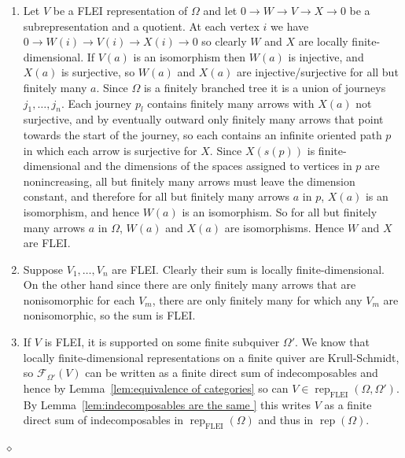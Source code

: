 \documentclass{article}
\newcommand{\FF}{\mathscr{F}}
\newenvironment{proof}{\vspace*{2ex}\noindent {\em Proof:}
}{\hfill $\diamond$ \\[2ex]}
\begin{document}
\begin{proof}
  \begin{enumerate}
  \item  Let $V$ be a FLEI representation of $\Omega$ and let $0 \to W \to V \to X \to 0$ be a subrepresentation and a quotient. At each vertex $i$ we have  $0 \to W(i) \to V(i) \to X(i) \to 0$ so clearly $W$ and $X$ are locally finite-dimensional. If $V(a)$ is an isomorphism then $W(a)$ is injective, and $X(a)$ is surjective,  so $W(a)$ and $X(a)$ are injective/surjective for all but finitely many $a$.  Since  $\Omega$ is a finitely branched tree it is a  union of journeys  $j_1, \ldots , j_n$.  Each journey $p_l$ contains finitely many arrows with $X(a)$ not surjective, and by eventually outward only finitely many arrows that point towards the start of the journey,  so each contains an infinite oriented path $p$ in which each arrow is surjective for $X$. Since $X(s(p))$ is finite-dimensional and the dimensions of the spaces assigned to vertices in $p$ are nonincreasing, all but finitely many arrows must leave the dimension constant, and therefore for all but finitely many arrows $a$ in $p$, $X(a)$ is an isomorphism, and hence $W(a)$ is an isomorphism.  So for all but finitely many arrows $a$ in $\Omega$, $W(a)$ and $X(a)$ are isomorphisms.  Hence $W$ and $X$ are FLEI.

    \item Suppose $V_1, \ldots, V_n$ are FLEI.  Clearly their sum is locally finite-dimensional.  On the other hand since there are only finitely many arrows that are nonisomorphic for each $V_m$, there are only finitely many for which any $V_m$ are nonisomorphic, so the sum is FLEI.
    
 \item If $V$ is FLEI, it is supported on some finite subquiver $\Omega'$.  We know that locally finite-dimensional representations on a finite quiver are Krull-Schmidt, so $\FF_{\Omega'}(V)$  can be written as a finite direct sum of indecomposables and hence by Lemma~\ref{lem:equivalence of categories} so can $V\in \operatorname{rep}_{\text{FLEI}}(\Omega,\Omega')$.  By Lemma~\ref{lem:indecomposables are the same } this writes $V$ as a finite direct sum of indecomposables in $\operatorname{rep}_{\text{FLEI}}(\Omega)$ and thus in $\operatorname{rep}(\Omega).$
\end{enumerate}

\end{proof}
\end{document}
